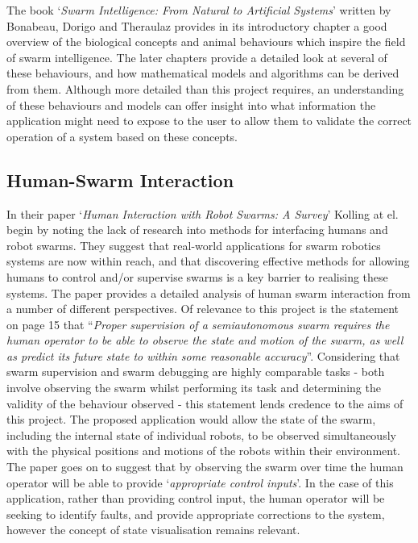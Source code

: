 \documentclass[titlepage,hidelinks,10pt]{article}
\begin{document}
The book `\textit{Swarm Intelligence: From Natural to Artificial Systems}' written by Bonabeau, Dorigo and Theraulaz \cite{FromNaturaltoArtificial} provides in its introductory chapter a good overview of the biological concepts and animal behaviours which inspire the field of swarm intelligence. The later chapters provide a detailed look at several of these behaviours, and how mathematical models and algorithms can be derived from them. Although more detailed than this project requires, an understanding of these behaviours and models can offer insight into what information the application might need to expose to the user to allow them to validate the correct operation of a system based on these concepts. 

\subsection{Human-Swarm Interaction} \label{HumanSwarmInteraction}
In their paper `\textit{Human Interaction with Robot Swarms: A Survey}' \cite{HumanSwarmInteractionSurvey} Kolling at el. begin by noting the lack of research into methods for interfacing humans and robot swarms. They suggest that real-world applications for swarm robotics systems are now within reach, and that discovering effective methods for allowing humans to control and/or supervise swarms is a key barrier to realising these systems. The paper \cite{HumanSwarmInteractionSurvey} provides a detailed analysis of human swarm interaction from a number of different perspectives. Of relevance to this project is the statement on page 15 that ``\textit{Proper supervision of a semiautonomous swarm requires the human operator to be able to observe the state and motion of the swarm, as well as predict its future state to within some reasonable accuracy}''. Considering that swarm supervision and swarm debugging are highly comparable tasks - both involve observing the swarm whilst performing its task and determining the validity of the behaviour observed  - this statement lends credence to the aims of this project. The proposed application would allow the state of the swarm, including the internal state of individual robots, to be observed simultaneously with the physical positions and motions of the robots within their environment. The paper \cite{HumanSwarmInteractionSurvey} goes on to suggest that by observing the swarm over time the human operator will be able to provide `\textit{appropriate control inputs}'. In the case of this application, rather than providing control input, the human operator will be seeking to identify faults, and provide appropriate corrections to the system, however the concept of state visualisation remains relevant.
\end{document}
